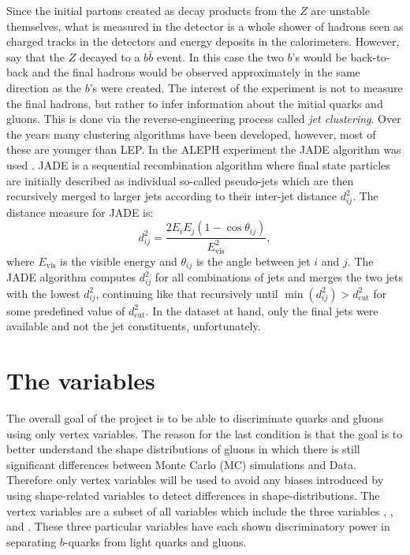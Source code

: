 Since the initial partons created as decay products from the $Z$ are unstable themselves, what is measured in the detector is a whole shower of hadrons seen as charged tracks in the detectors and energy deposits in the calorimeters. However, say that the $Z$  decayed to a $b\bar{b}$ event. In this case the two $b$'s would be back-to-back and the final hadrons would be observed approximately in the same direction as the $b$'s were created. The interest of the experiment is not to measure the final hadrons, but rather to infer information about the initial quarks and gluons. This is done via the reverse-engineering process called \emph{jet clustering}. Over the years many clustering algorithms have been developed, however, most of these are younger than LEP. In the ALEPH experiment the JADE algorithm was used \autocite{bartelExperimentalStudyJets1981}. JADE is a sequential recombination algorithm where final state particles are initially described as individual so-called pseudo-jets which are then recursively merged to larger jets according to their inter-jet distance $d^2_{ij}$. The distance measure for JADE is:
\begin{equation}
  d^2_{ij} = \frac{2E_i E_j (1 - \cos\theta_{ij})}{E^2_\mathrm{vis}},
\end{equation}
where $E_\mathrm{vis}$ is the visible energy and $\theta_{ij}$ is the angle between jet $i$ and $j$. The JADE algorithm computes $d^2_{ij}$ for all combinations of jets and merges the two jets with the lowest $d^2_{ij}$, continuing like that recursively until $\min(d^2_{ij}) > d^2_\mathrm{cut}$ for some predefined value of $d^2_\mathrm{cut}$. In the dataset at hand, only the final jets were available and not the jet constituents, unfortunately. 

\section{The variables}
The overall goal of the project is to be able to discriminate quarks and gluons using only vertex variables. The reason for the last condition is that the goal is to better understand the shape distributions of gluons in which there is still significant differences between Monte Carlo (MC) simulations and Data. Therefore only vertex variables will be used to avoid any biases introduced by using shape-related variables to detect differences in shape-distributions. 
The vertex variables are a subset of all variables which include the three variables , , and . These three particular variables have each shown discriminatory power in separating $b$-quarks from light quarks and gluons. 

